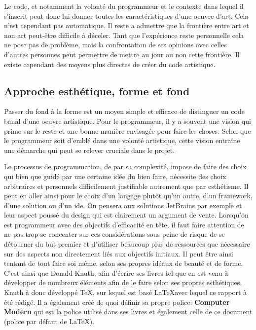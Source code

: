 \documentclass[12pt]{article} %
\begin{document}
Le code, et notamment la volonté du programmeur et le contexte dans lequel il s'inscrit peut donc lui donner toutes les caractéristiques d'une oeuvre d'art. Cela n'est cependant pas automatique. Il reste a admettre que la frontière entre art et non art peut-être difficile à déceler. Tant que l'expérience reste personnelle cela ne pose pas de problème, mais la confrontation de ses opinions avec celles d'autres personnes peut permettre de mettre au jour ou non cette frontière. Il existe cependant des moyens plus directes de créer du code artistique.

\subsection{Approche esthétique, forme et fond} %
Passer du fond à la forme est un moyen simple et efficace de distinguer un code banal d'une oeuvre artistique. Pour le programmeur, il y a souvent une vision qui prime sur le reste et une bonne manière envisagée pour faire les choses. Selon que le programmeur soit d'emblé dans une volonté artistique, cette vision entraîne une démarche qui peut se relever cruciale dans le projet.

Le processus de programmation, de par sa complexité, impose de faire des choix qui bien que guidé par une certaine idée du bien faire, nécessite des choix arbitraires et personnels difficilement justifiable autrement que par esthétisme. Il peut en aller ainsi pour le choix d'un langage plutôt qu'un autre, d'un framework, d'une solution ou d'un \acrshort{ide}. On pensera aux solutions JetBrains par exemple et leur aspect poussé du design qui est clairement un argument de vente. Lorsqu'on est programmeur avec des objectifs d'efficacité en tête, il faut faire attention de ne pas trop se concenter sur ces considérations sous peine de risque de se détourner du but premier et d'utiliser beaucoup plus de ressources que nécessaire sur des aspects non directement liés aux objectifs initiaux. Il peut être ainsi tentant de tout faire soi même, selon ses propres idéaux de beauté et de forme. C'est ainsi que Donald Knuth, afin d'écrire ses livres tel que  \cite{DKnuth1997} en est venu à développer de nombreux éléments afin de le faire selon ses propres esthétiques. Knuth à donc développé TeX, sur lequel est basé \LaTeX avec lequel ce rapport à été rédigé. Il a également créé de quoi définir sa propre police: \textbf{Computer Modern} qui est la police utilisé dans ses livres et également celle de ce document (police par défaut de \LaTeX). 
\end{document}
